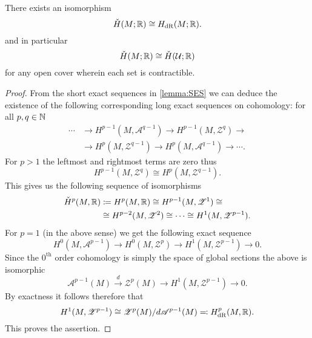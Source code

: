 \documentclass[11pt]{preprint}
\def\cA{\mathscr{A}}
\def\cZ{\mathscr{Z}}
\def\Cech{\check{H}}
\def\Rham{H_{\mathrm{dR}}}
\numberwithin{equation}{section}
\begin{document}
\begin{theorem}
    There exists an isomorphism
    \[ 
       \Cech(M ; \R) \cong \Rham(M;\R). 
    \]
    and in particular 
    \[
       \Cech(M ; \R) \cong   \Cech(\mathcal U ; \R)
    \]
    for any open cover wherein each set is contractible.
\end{theorem}
\begin{proof}
  From the short exact sequences in \autoref{lemma:SES} we can deduce the existence of the following corresponding long exact sequences on cohomology: for all $p,q \in {\mathbb N}$
  \begin{align*}
    \cdots &\longrightarrow H^{p-1}(M, \cA^{q-1}) \longrightarrow H^{p-1}(M, \cZ^{q})\longrightarrow \\
    & \longrightarrow H^{p}(M, \cZ^{q-1})\longrightarrow H^{p}(M, \cA^{q-1})\longrightarrow \cdots.
  \end{align*}
  For $p > 1$ the leftmost and rightmost terms are zero thus 
  \[
    H^{p-1}(M, \cZ^{q}) \cong  H^{p}(M, \cZ^{q-1}).
  \]
  This gives us the following sequence of isomorphisms
  \begin{align*}
    \Cech^p(M, \R) &\coloneqq H^p(M,\R) \cong H^{p-1}(M,\cZ^{1}) \cong\\
    & \cong  H^{p-2}(M,\cZ^{2}) \cong \cdots \cong  H^{1}(M,\cZ^{p-1}).
  \end{align*}
  For $p = 1$ (in the above sense) we get the following exact sequence
  \[
      H^0(M, \cA^{p-1}) \longrightarrow  H^0(M, \cZ^{p}) \longrightarrow H^1(M, \cZ^{p-1}) \longrightarrow 0.  
  \]
  Since the $0^{\text{th}}$ order cohomology is simply the space of global sections the above is isomorphic
  \[
      \cA^{p-1}(M) \stackrel{d}{\longrightarrow} \cZ^{p}(M) \longrightarrow H^1(M, \cZ^{p-1}) \longrightarrow 0.  
  \] 
  By exactness it follows therefore that 
  \[
      H^1(M, \cZ^{p-1}) \cong   \cZ^{p}(M) /  d \cA^{p-1}(M) \eqqcolon \Rham^p(M, \R).
  \]
  This proves the assertion.
\end{proof}







\end{document}
